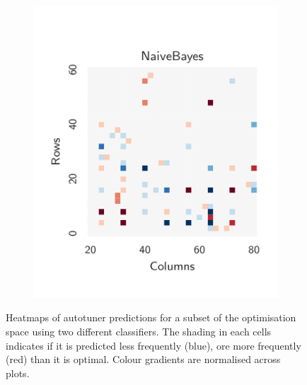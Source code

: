 \documentclass[nonatbib,preprint,9pt]{sigplanconf}
\begin{document}
\begin{figure}
\begin{subfigure}[t]{0.48\columnwidth}
\includegraphics[width=\columnwidth]{img/heatmap_2}
\vspace{-1.5em} %
\caption{}
\label{fig:class-hmaps-2}
\end{subfigure}
\caption{%
  Heatmaps of autotuner predictions for a subset of the optimisation
  space using two different classifiers. The shading in each cells
  indicates if it is predicted less frequently (blue), ore more
  frequently (red) than it is optimal. Colour gradients are normalised
  across plots.%
}
\label{fig:class-hmaps}
\end{figure}
\end{document}
